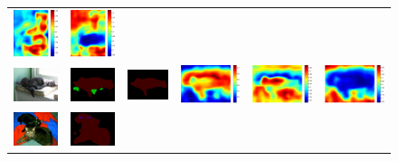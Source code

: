 \documentclass[10pt,twocolumn,letterpaper]{article}
\begin{document}
\begin{figure}
\begin{tabular}{c c c c c c}
   \includegraphics[height=0.12\linewidth]{fig/voc12/att2/2011_000813.pdf} &
   \includegraphics[height=0.12\linewidth]{fig/voc12/att3/2011_000813.pdf} \\
   \includegraphics[height=0.092\linewidth]{fig/voc12/img/2010_004120.jpg} &
   \includegraphics[height=0.092\linewidth]{fig/voc12/res_baseline/2010_004120.png} &
   \includegraphics[height=0.092\linewidth]{fig/voc12/res_sharenet/2010_004120.png} &
   \includegraphics[height=0.092\linewidth]{fig/voc12/att1/2010_004120.pdf} &
   \includegraphics[height=0.092\linewidth]{fig/voc12/att2/2010_004120.pdf} &
   \includegraphics[height=0.092\linewidth]{fig/voc12/att3/2010_004120.pdf} \\
   \includegraphics[height=0.09\linewidth]{fig/voc12/img/2010_005344.jpg} &
   \includegraphics[height=0.09\linewidth]{fig/voc12/res_baseline/2010_005344.png} &

\end{tabular}
\end{figure}
\end{document}
